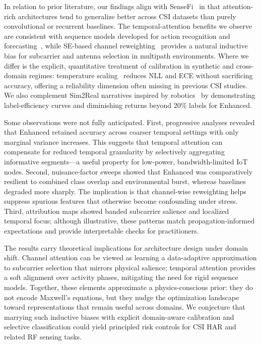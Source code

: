 \documentclass[journal]{IEEEtran}
\begin{document}
In relation to prior literature, our findings align with SenseFi~\cite{yang2023sensefi} in that attention-rich architectures tend to generalize better across CSI datasets than purely convolutional or recurrent baselines. The temporal-attention benefits we observe are consistent with sequence models developed for action recognition and forecasting~\cite{li2020tea,bertasius2021timesformer,lim2021tft,zhou2021informer}, while SE-based channel reweighting~\cite{se_networks2018} provides a natural inductive bias for subcarrier and antenna selection in multipath environments. Where we differ is the explicit, quantitative treatment of calibration in synthetic and cross-domain regimes: temperature scaling~\cite{calibration_guo2017} reduces NLL and ECE without sacrificing accuracy, offering a reliability dimension often missing in previous CSI studies. We also complement Sim2Real narratives inspired by robotics~\cite{peng2018sim2real} by demonstrating label-efficiency curves and diminishing returns beyond 20\% labels for Enhanced.

Some observations were not fully anticipated. First, progressive analyses revealed that Enhanced retained accuracy across coarser temporal settings with only marginal variance increases. This suggests that temporal attention can compensate for reduced temporal granularity by selectively aggregating informative segments—a useful property for low-power, bandwidth-limited IoT nodes. Second, nuisance-factor sweeps showed that Enhanced was comparatively resilient to combined class overlap and environmental burst, whereas baselines degraded more sharply. The implication is that channel-wise reweighting helps suppress spurious features that otherwise become confounding under stress. Third, attribution maps showed banded subcarrier salience and localized temporal focus; although illustrative, these patterns match propagation-informed expectations and provide interpretable checks for practitioners.

The results carry theoretical implications for architecture design under domain shift. Channel attention can be viewed as learning a data-adaptive approximation to subcarrier selection that mirrors physical salience; temporal attention provides a soft alignment over activity phases, mitigating the need for rigid sequence models. Together, these elements approximate a physics-conscious prior: they do not encode Maxwell’s equations, but they nudge the optimization landscape toward representations that remain useful across domains. We conjecture that marrying such inductive biases with explicit domain-aware calibration and selective classification could yield principled risk controls for CSI HAR and related RF sensing tasks.
\end{document}
